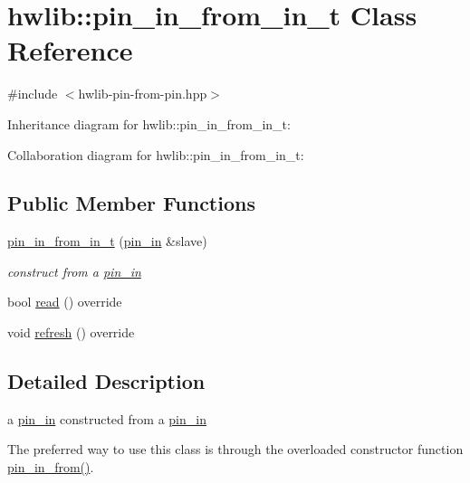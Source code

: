 \hypertarget{classhwlib_1_1pin__in__from__in__t}{}\section{hwlib\+:\+:pin\+\_\+in\+\_\+from\+\_\+in\+\_\+t Class Reference}
\label{classhwlib_1_1pin__in__from__in__t}


{\ttfamily \#include $<$hwlib-\/pin-\/from-\/pin.\+hpp$>$}



Inheritance diagram for hwlib\+:\+:pin\+\_\+in\+\_\+from\+\_\+in\+\_\+t\+:


Collaboration diagram for hwlib\+:\+:pin\+\_\+in\+\_\+from\+\_\+in\+\_\+t\+:
\subsection*{Public Member Functions}
\begin{DoxyCompactItemize}
\item 
\mbox{\label{classhwlib_1_1pin__in__from__in__t_aece03e4748fd44053d033353a16893eb}} 
\hyperlink{classhwlib_1_1pin__in__from__in__t_aece03e4748fd44053d033353a16893eb}{pin\+\_\+in\+\_\+from\+\_\+in\+\_\+t} (\hyperlink{classhwlib_1_1pin__in}{pin\+\_\+in} \&slave)
\begin{DoxyCompactList}\small\item\em construct from a \hyperlink{classhwlib_1_1pin__in}{pin\+\_\+in} \end{DoxyCompactList}\item 
bool \hyperlink{classhwlib_1_1pin__in__from__in__t_a981fa53647035e85ac71ec426c41b69f}{read} () override
\item 
void \hyperlink{classhwlib_1_1pin__in__from__in__t_ae56094d43a2fe9d38fc52af4cfef4b2c}{refresh} () override
\end{DoxyCompactItemize}


\subsection{Detailed Description}
a \hyperlink{classhwlib_1_1pin__in}{pin\+\_\+in} constructed from a \hyperlink{classhwlib_1_1pin__in}{pin\+\_\+in}

The preferred way to use this class is through the overloaded constructor function \hyperlink{namespacehwlib_a2f8ff4c157c60783c37db6bb1e11e3a4}{pin\+\_\+in\+\_\+from()}. 

